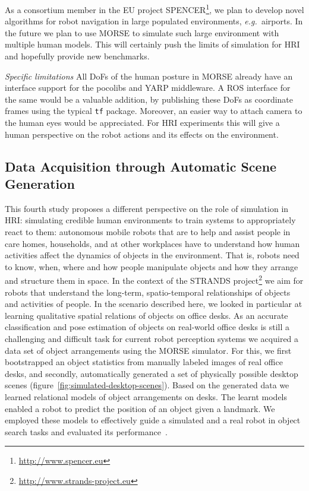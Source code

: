 \documentclass{llncs}
\newcommand{\eg}{{\textit{e.g.~}}}
\begin{document}
As a consortium member in the EU project
SPENCER\footnote{\url{http://www.spencer.eu}}, we plan to develop novel
algorithms for robot navigation in large populated environments, \eg airports.
In the future we plan to use MORSE to simulate such large environment with
multiple human models. This will certainly push the limits of simulation for HRI
and hopefully provide new benchmarks.

\emph{Specific limitations} All DoFs of the human posture in MORSE already have an
interface support for the {\sc pocolibs} and YARP middleware. A ROS interface
for the same would be a valuable addition, by publishing these DoFs
as coordinate frames using the typical {\tt tf} package. Moreover, an easier
way to attach camera to the human eyes would be appreciated. For HRI experiments
this will give a human perspective on the robot actions and its effects on the
environment.


\subsection{Data Acquisition through Automatic Scene Generation}
\label{sc:generation}

This fourth study proposes a different perspective on the role of simulation in
HRI: simulating credible human environments to train systems to appropriately
react to them: autonomous mobile robots that are to help and assist people in
care homes, households, and at other workplaces have to understand how human
activities affect the dynamics of objects in the environment. That is, robots
need to know, when, where and how people manipulate objects and how they arrange
and structure them in space. In the context of the STRANDS
project\footnote{\url{http://www.strands-project.eu}} we aim for robots that
understand the long-term, spatio-temporal relationships of objects and
activities of people. In the scenario described here, we looked in
particular at learning qualitative spatial relations of objects on office desks.
As an accurate classification and pose estimation of objects on real-world
office desks is still a challenging and difficult task for current robot
perception systems we acquired a data set of object arrangements using the MORSE
simulator. For this, we first bootstrapped an object statistics from manually
labeled images of real office desks, and secondly, automatically generated a set
of physically possible desktop scenes
(figure~\ref{fig:simulated-desktop-scenes}). Based on the generated data we
learned relational models of object arrangements on desks. The learnt models
enabled a robot to predict the position of an object given a landmark. We
employed these models to effectively guide a simulated and a real robot in
object search tasks and evaluated its performance~\cite{kunze14indirect}.
\end{document}
